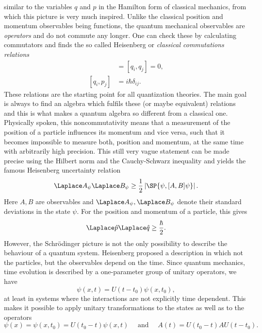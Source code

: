 similar to the variables $q$ and $p$ in the Hamilton form of classical 
mechanics, from which this picture is very much inspired. Unlike the classical 
position and momentum observables being functions, the quantum mechanical 
observables are \emph{operators} and do not commute any longer. One can check 
these by calculating commutators and finds the so called Heisenberg or 
\emph{classical commutations relations}
\begin{align}
	[p_i, p_j]
	& =
	[q_i, q_j]
	=
	0,
	\\
	[q_i, p_j]
	& =
	i \hbar \delta_{ij}.
\end{align}
These relations are the starting point for all quantization theories. The main 
goal is always to find an algebra which fulfils these (or maybe equivalent) 
relations and this is what makes a quantum algebra so different from a 
classical one. Physically spoken, this noncommutativity means that a 
measurement of the position of a particle influences its momentum and vice 
versa, such that it becomes impossible to measure both, position and momentum, 
at the same time with arbitrarily high precision. This still very vague 
statement can be made precise using the Hilbert norm and the Cauchy-Schwarz 
inequality and yields the famous Heisenberg uncertainty relation
\begin{equation*}
	\Laplace A_\psi
	\Laplace B_\psi
	\geq
	\frac{1}{2}
	\left|
		\SP{\psi, [A, B] \psi}
	\right|.
\end{equation*}
Here $A, B$ are observables and $\Laplace A_\psi, \Laplace B_\psi$ denote their 
standard deviations in the state $\psi$. For the position and momentum of a 
particle, this gives
\begin{equation*}
	\Laplace \hat{p}
	\Laplace \hat{q}
	\geq
	\frac{\hbar}{2}.
\end{equation*}
However, the Schr\"odinger picture is not the only possibility to describe the 
behaviour of a quantum system. Heisenberg proposed a description in which not 
the particles, but the observables depend on the time. Since quantum mechanics,
time evolution is described by a one-parameter group of unitary operators, we have
\begin{equation*}
	\psi(x,t)
	=
	U(t - t_0) \psi(x, t_0),
\end{equation*}
at least in systems where the interactions are not explicitly time dependent. 
This makes it possible to apply unitary transformations to the states 
as well as to the operators 
\begin{equation*}
	\psi(x)
	=
	\psi(x, t_0)
	=
	U(t_0 - t) \psi(x, t)
	\quad \text{ and } \quad
	A(t)
	=
	U(t_0 - t)
	A
	U(t - t_0).
\end{equation*}
